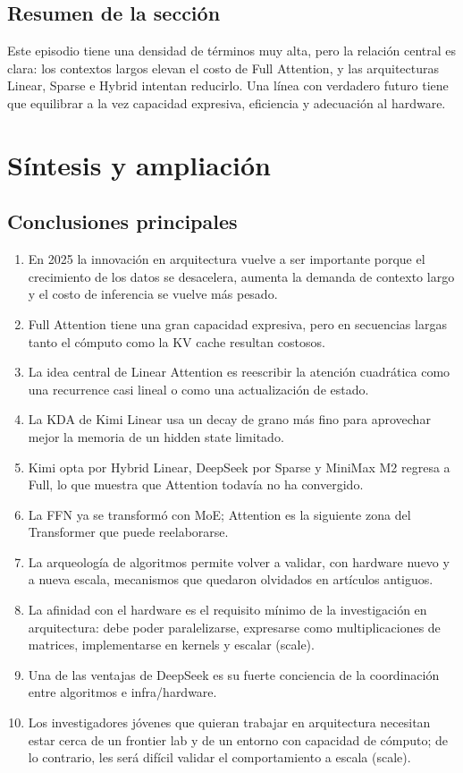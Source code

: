 \documentclass[a4paper]{article}
\begin{document}
\subsection{Resumen de la sección}

Este episodio tiene una densidad de términos muy alta, pero la relación central es clara: los contextos largos elevan el costo de Full Attention, y las arquitecturas Linear, Sparse e Hybrid intentan reducirlo. Una línea con verdadero futuro tiene que equilibrar a la vez capacidad expresiva, eficiencia y adecuación al hardware.
\section{Síntesis y ampliación}

\subsection{Conclusiones principales}

\begin{enumerate}
\item En 2025 la innovación en arquitectura vuelve a ser importante porque el crecimiento de los datos se desacelera, aumenta la demanda de contexto largo y el costo de inferencia se vuelve más pesado.
\item Full Attention tiene una gran capacidad expresiva, pero en secuencias largas tanto el cómputo como la KV cache resultan costosos.
\item La idea central de Linear Attention es reescribir la atención cuadrática como una recurrence casi lineal o como una actualización de estado.
\item La KDA de Kimi Linear usa un decay de grano más fino para aprovechar mejor la memoria de un hidden state limitado.
\item Kimi opta por Hybrid Linear, DeepSeek por Sparse y MiniMax M2 regresa a Full, lo que muestra que Attention todavía no ha convergido.
\item La FFN ya se transformó con MoE; Attention es la siguiente zona del Transformer que puede reelaborarse.
\item La arqueología de algoritmos permite volver a validar, con hardware nuevo y a nueva escala, mecanismos que quedaron olvidados en artículos antiguos.
\item La afinidad con el hardware es el requisito mínimo de la investigación en arquitectura: debe poder paralelizarse, expresarse como multiplicaciones de matrices, implementarse en kernels y escalar (scale).
\item Una de las ventajas de DeepSeek es su fuerte conciencia de la coordinación entre algoritmos e infra/hardware.
\item Los investigadores jóvenes que quieran trabajar en arquitectura necesitan estar cerca de un frontier lab y de un entorno con capacidad de cómputo; de lo contrario, les será difícil validar el comportamiento a escala (scale).
\end{enumerate}
\end{document}
